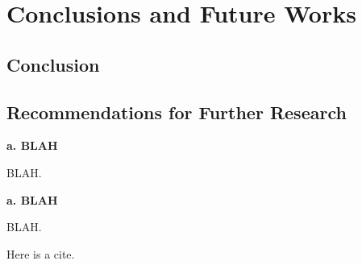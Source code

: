 \chapter[Conclusion and Future Work]{Conclusions and Future Works}
\label{chap:chap_final}


\textit{\fontsize{14pt}{\baselineskip}\selectfont{
		\lipsum[1]
	}}
\newpage

\section{Conclusion}
\lipsum[1]

\section{Recommendations for Further Research}
\lipsum[1]

\noindent\textbf{a. BLAH}

\noindent BLAH.

\lipsum[1]

\noindent\textbf{a. BLAH}

\noindent BLAH.

\lipsum[1]

Here is a cite. \cite{example}

\forcedoublepage